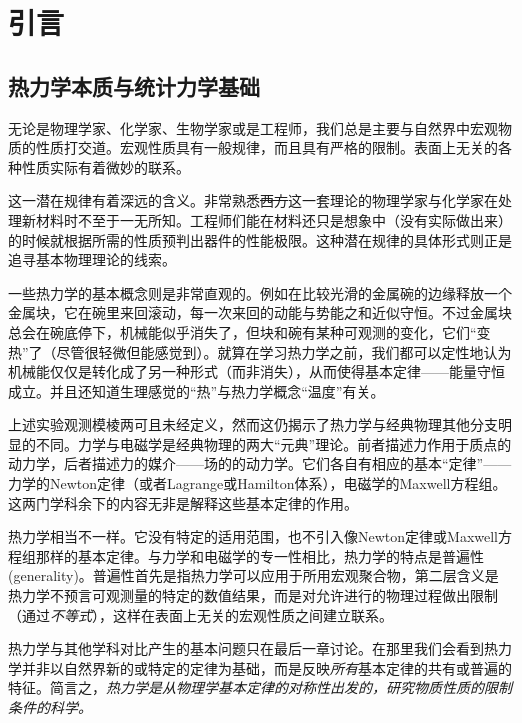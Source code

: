 

\chapter*{引言}
\section*{热力学本质与统计力学基础}

无论是物理学家、化学家、生物学家或是工程师，我们总是主要与自然界中宏观物质的性质打交道。宏观性质具有一般规律，而且具有严格的限制。表面上无关的各种性质实际有着微妙的联系。

这一潜在规律有着深远的含义。非常熟悉\sout{西方}这一套理论的物理学家与化学家在处理新材料时不至于一无所知。工程师们能在材料还只是想象中（没有实际做出来）的时候就根据所需的性质预判出器件的性能极限。这种潜在规律的具体形式则正是追寻基本物理理论的线索。

一些热力学的基本概念则是非常直观的。例如在比较光滑的金属碗的边缘释放一个金属块，它在碗里来回滚动，每一次来回的动能与势能之和近似守恒。不过金属块总会在碗底停下，机械能似乎消失了，但块和碗有某种可观测的变化，它们“变热”了（尽管很轻微但能感觉到）。就算在学习热力学之前，我们都可以定性地认为机械能仅仅是转化成了另一种形式（而非消失），从而使得基本定律——能量守恒成立。并且还知道生理感觉的“热”与热力学概念“温度”有关。

上述实验观测模棱两可且未经定义，然而这仍揭示了热力学与经典物理其他分支明显的不同。力学与电磁学是经典物理的两大“元典”理论。前者描述力作用于质点的动力学，后者描述力的媒介——场的的动力学。它们各自有相应的基本“定律”——力学的Newton定律（或者Lagrange或Hamilton体系），电磁学的Maxwell方程组。这两门学科余下的内容无非是解释这些基本定律的作用。

热力学相当不一样。它没有特定的适用范围，也不引入像Newton定律或Maxwell方程组那样的基本定律。与力学和电磁学的专一性相比，热力学的特点是普遍性(generality)。普遍性首先是指热力学可以应用于所用宏观聚合物，第二层含义是热力学不预言可观测量的特定的数值结果，而是对允许进行的物理过程做出限制（通过{\it 不等式}），这样在表面上无关的宏观性质之间建立联系。

热力学与其他学科对比产生的基本问题只在最后一章讨论。在那里我们会看到热力学并非以自然界新的或特定的定律为基础，而是反映{\it 所有}基本定律的共有或普遍的特征。简言之，{\it 热力学是从物理学基本定律的对称性出发的，研究物质性质的限制条件的科学。}

